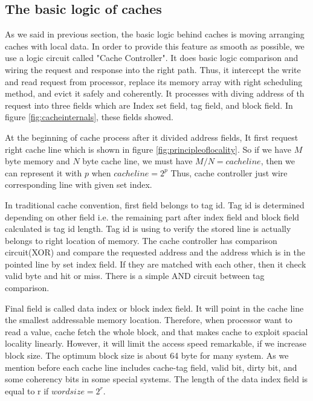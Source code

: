    \subsection{The basic logic of caches}
    As we said in previous section, the basic logic behind caches is moving arranging caches with local data. In order to provide this feature as smooth as possible, we use a logic circuit called "Cache Controller". It does basic logic comparison and wiring the request and response into the right path. Thus, it intercept the write and read request from processor, replace its memory array with right scheduling method, and evict it safely and coherently. It processes with diving address of th request into three fields which are  Index set field, tag field, and block field. In figure \ref{fig:cacheinternals}, these fields showed. 

    At the beginning of cache process after it divided address fields, It first request right cache line which is shown in figure \ref{fig:principleoflocality}. So if we have $M$ byte memory and $N$ byte cache line, we must have $M/N = cache line$, then we can represent it with $p$ when $cache line = 2^{p}$ Thus, cache controller just wire corresponding line with given set index. 

    In traditional cache convention, first field belongs to tag id. Tag id is determined depending on other field i.e. the remaining part after index field and block field calculated is tag id length. Tag id is using to verify the stored line is actually belongs to right location of memory. The cache controller has comparison circuit(XOR) and compare the requested address and the address which is in the pointed line by set index field. If they are matched with each other, then it check valid byte and hit or miss. There is a simple AND circuit between tag comparison. 

    Final field is called data index or block index field. It will point in the cache line the smallest addressable memory location. Therefore, when processor want to read a value, cache fetch the whole block, and that makes cache to exploit spacial locality linearly. However, it will limit the access speed remarkable, if we increase block size. The optimum block size is about 64 byte for many system. As we mention before each cache line includes cache-tag field, valid bit, dirty bit, and some coherency bits in some special systems. The length of the data index field is equal to r if  $ word size = 2^{r}  $.

